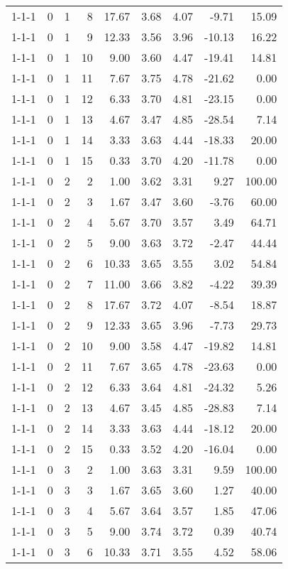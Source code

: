 \begin{tabular}{lrrrrrrrr}
1-1-1 & 0 & 1 & 8 & 17.67 & 3.68 & 4.07 & -9.71 & 15.09 \\
1-1-1 & 0 & 1 & 9 & 12.33 & 3.56 & 3.96 & -10.13 & 16.22 \\
1-1-1 & 0 & 1 & 10 & 9.00 & 3.60 & 4.47 & -19.41 & 14.81 \\
1-1-1 & 0 & 1 & 11 & 7.67 & 3.75 & 4.78 & -21.62 & 0.00 \\
1-1-1 & 0 & 1 & 12 & 6.33 & 3.70 & 4.81 & -23.15 & 0.00 \\
1-1-1 & 0 & 1 & 13 & 4.67 & 3.47 & 4.85 & -28.54 & 7.14 \\
1-1-1 & 0 & 1 & 14 & 3.33 & 3.63 & 4.44 & -18.33 & 20.00 \\
1-1-1 & 0 & 1 & 15 & 0.33 & 3.70 & 4.20 & -11.78 & 0.00 \\
1-1-1 & 0 & 2 & 2 & 1.00 & 3.62 & 3.31 & 9.27 & 100.00 \\
1-1-1 & 0 & 2 & 3 & 1.67 & 3.47 & 3.60 & -3.76 & 60.00 \\
1-1-1 & 0 & 2 & 4 & 5.67 & 3.70 & 3.57 & 3.49 & 64.71 \\
1-1-1 & 0 & 2 & 5 & 9.00 & 3.63 & 3.72 & -2.47 & 44.44 \\
1-1-1 & 0 & 2 & 6 & 10.33 & 3.65 & 3.55 & 3.02 & 54.84 \\
1-1-1 & 0 & 2 & 7 & 11.00 & 3.66 & 3.82 & -4.22 & 39.39 \\
1-1-1 & 0 & 2 & 8 & 17.67 & 3.72 & 4.07 & -8.54 & 18.87 \\
1-1-1 & 0 & 2 & 9 & 12.33 & 3.65 & 3.96 & -7.73 & 29.73 \\
1-1-1 & 0 & 2 & 10 & 9.00 & 3.58 & 4.47 & -19.82 & 14.81 \\
1-1-1 & 0 & 2 & 11 & 7.67 & 3.65 & 4.78 & -23.63 & 0.00 \\
1-1-1 & 0 & 2 & 12 & 6.33 & 3.64 & 4.81 & -24.32 & 5.26 \\
1-1-1 & 0 & 2 & 13 & 4.67 & 3.45 & 4.85 & -28.83 & 7.14 \\
1-1-1 & 0 & 2 & 14 & 3.33 & 3.63 & 4.44 & -18.12 & 20.00 \\
1-1-1 & 0 & 2 & 15 & 0.33 & 3.52 & 4.20 & -16.04 & 0.00 \\
1-1-1 & 0 & 3 & 2 & 1.00 & 3.63 & 3.31 & 9.59 & 100.00 \\
1-1-1 & 0 & 3 & 3 & 1.67 & 3.65 & 3.60 & 1.27 & 40.00 \\
1-1-1 & 0 & 3 & 4 & 5.67 & 3.64 & 3.57 & 1.85 & 47.06 \\
1-1-1 & 0 & 3 & 5 & 9.00 & 3.74 & 3.72 & 0.39 & 40.74 \\
1-1-1 & 0 & 3 & 6 & 10.33 & 3.71 & 3.55 & 4.52 & 58.06 \\

\end{tabular}

